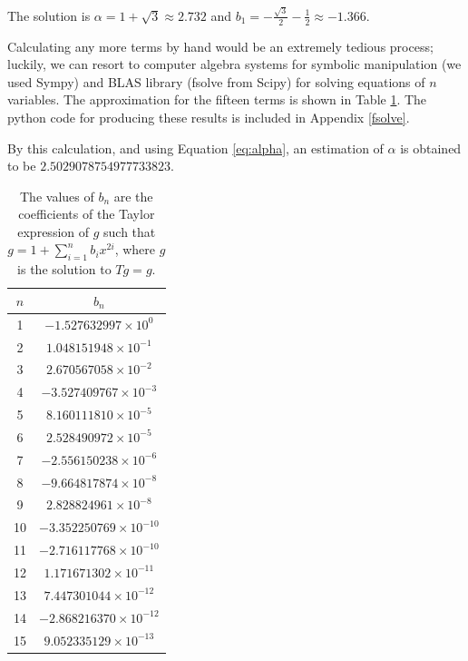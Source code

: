 The solution is $\alpha = 1 + \sqrt{3} \approx 2.732$ and $b_1 = - \frac{\sqrt{3}}{2} - \frac{1}{2} \approx -1.366$.

Calculating any more terms by hand would be an extremely tedious process; luckily, we can resort to computer algebra systems for symbolic manipulation (we used Sympy) and BLAS library (fsolve from Scipy) for solving equations of $n$ variables. 
The approximation for the fifteen terms is shown in Table \ref{tb:b_i table}.
The python code for producing these results is included in Appendix \ref{fsolve}.

By this calculation, and using Equation \eqref{eq:alpha}, an estimation of $\alpha$ is obtained to be $2.5029078754977733823$.

\begin{table}
\centering
\begin{tabular}{|c|c|}
\hline
$n$ & $b_n$ \\
\hline
1 & \( -1.527632997 \times 10^{0} \) \\
2 & \( 1.048151948 \times 10^{-1} \) \\
3 & \( 2.670567058 \times 10^{-2} \) \\
4 & \( -3.527409767 \times 10^{-3} \) \\
5 & \( 8.160111810 \times 10^{-5} \) \\
6 & \( 2.528490972 \times 10^{-5} \) \\
7 & \( -2.556150238 \times 10^{-6} \) \\
8 & \( -9.664817874 \times 10^{-8} \) \\
9 & \( 2.828824961 \times 10^{-8} \) \\
10 & \( -3.352250769 \times 10^{-10} \) \\
11 & \( -2.716117768 \times 10^{-10} \) \\
12 & \( 1.171671302 \times 10^{-11} \) \\
13 & \( 7.447301044 \times 10^{-12} \) \\
14 & \( -2.868216370 \times 10^{-12} \) \\
15 & \( 9.052335129 \times 10^{-13} \) \\
\hline
\end{tabular}
\caption{The values of $b_n$ are the coefficients of the Taylor expression of $g$ such that $g = 1 + \sum_{i=1}^n b_i x^{2i}$, where $g$ is the solution to $Tg = g$.
}
\label{tb:b_i table}
\end{table}